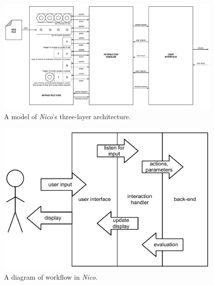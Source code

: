 \documentclass[12pt,twoside,notitlepage,xetex]{report}
\begin{document}
\begin{landscape}
\begin{center}
\begin{figure}[H]
\begin{center}
\includegraphics[height=\textheight-2cm]{figs/nico_arch_new.pdf}
\end{center}
\caption{A model of \emph{Nico}'s three-layer architecture.}
\label{fig:NicoArch}
\end{figure}
\end{center}
\end{landscape}

\begin{center}
\begin{figure}[H]
\begin{center}
\includegraphics[width=\textwidth-2cm]{figs/nico_arch.pdf}
\end{center}
\caption{A diagram of workflow in \emph{Nico}.}
\label{fig:NicoFlow}
\end{figure}
\end{center}
\end{document}
